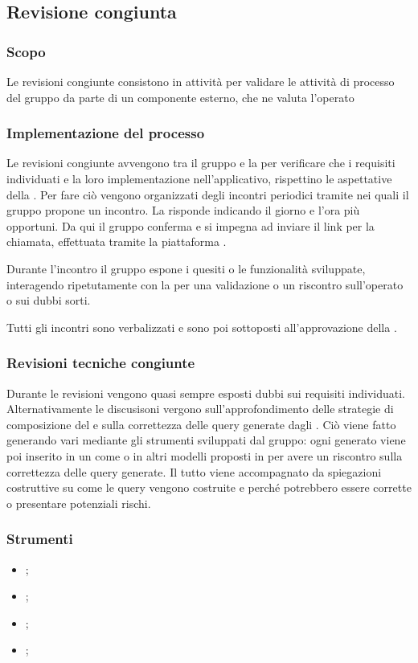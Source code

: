\subsection{Revisione congiunta}\label{revisione_congiunta}

\subsubsection{Scopo}
\par Le revisioni congiunte consistono in attività per validare le attività di processo del gruppo da parte di un componente esterno, che ne valuta l'operato

\subsubsection{Implementazione del processo}
\par Le revisioni congiunte avvengono tra il gruppo e la  per verificare che i requisiti individuati e la loro implementazione nell'applicativo, rispettino le aspettative della . Per fare ciò vengono organizzati degli incontri periodici tramite  nei quali il gruppo propone un incontro. La  risponde indicando il giorno e l'ora più opportuni. Da qui il gruppo conferma e si impegna ad inviare il link per la chiamata, effettuata tramite la piattaforma .
\par Durante l'incontro il gruppo espone i quesiti o le funzionalità sviluppate, interagendo ripetutamente con la  per una validazione o un riscontro sull'operato o sui dubbi sorti.
\par Tutti gli incontri sono verbalizzati e sono poi sottoposti all'approvazione della .

\subsubsection{Revisioni tecniche congiunte}
\par Durante le revisioni vengono quasi sempre esposti dubbi sui requisiti individuati. Alternativamente le discusisoni vergono sull'approfondimento delle strategie di composizione del  e sulla correttezza delle query generate dagli . Ciò viene fatto generando vari  mediante gli strumenti sviluppati dal gruppo: ogni  generato viene poi inserito in un  come  o in altri modelli proposti in  per avere un riscontro sulla correttezza delle query generate. Il tutto viene accompagnato da spiegazioni costruttive su come le query vengono costruite e perché potrebbero essere corrette o presentare potenziali rischi.

\subsubsection{Strumenti}
\begin{itemize}
    \item {};
    \item {};
    \item {};
    \item {};
\end{itemize}